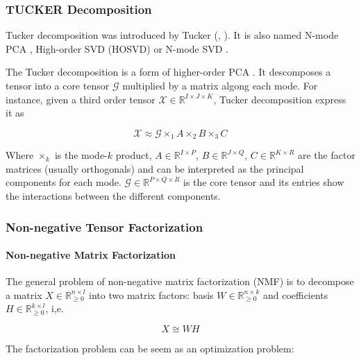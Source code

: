 \documentclass[letterpaper,12pt]{article}
\begin{document}
\subsubsection{TUCKER Decomposition}

Tucker decomposition was introduced by Tucker (\cite{Tucker1963}, \cite{Tucker1964}). It is also named N-mode PCA \cite{Kapteyn1986}, High-order SVD (HOSVD) \cite{DeLathauwer2000} or N-mode SVD \cite{Vasilescu2002}.

The Tucker decomposition is a form of higher-order PCA \cite{Kolda2009}. It descomposes a tensor into a core tensor $\mathcal{G}$ multiplied by a matrix algong each mode. For instance, given a third order tensor $\mathcal{X}\in\mathbb{R}^{I\times J\times K}$, Tucker decomposition express it as 

\begin{equation}
 \mathcal{X}\approx \mathcal{G}\times_1 A \times_2 B \times_3 C
\end{equation}

Where $\times_k$ is the mode-$k$ product, $A\in \mathbb{R}^{I\times P}$, $B\in \mathbb{R}^{J\times Q}$, $C\in \mathbb{R}^{K\times R}$ are the factor matrices (usually orthogonals) and can be interpreted as the principal components for each mode. $\mathcal{G}\in\mathbb{R}^{P\times Q \times R}$ is the core tensor and its entries show the interactions between the different components.

\subsubsection{Non-negative Tensor Factorization}

\paragraph{Non-negative Matrix Factorization}

The general problem of non-negative matrix factorization (NMF) is to decompose a matrix $X \in \mathbb{R}_{\geq 0}^{n\times l}$ into two matrix factors: basis $W \in \mathbb{R}_{\geq 0}^{n\times k}$  and coefficients $H \in \mathbb{R}_{\geq 0}^{k\times l}$, i,e.

\begin{equation}
X\cong W H\label{eq:matrix-factorization}
\end{equation}
 
The factorization problem can be seem as an optimization problem:
\end{document}
